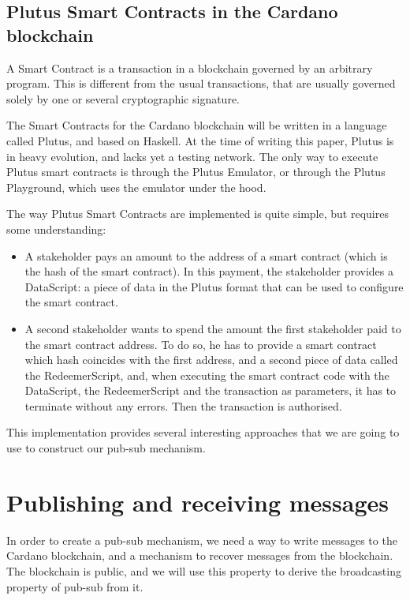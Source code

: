 \documentclass{article}
\begin{document}
\subsection{Plutus Smart Contracts in the Cardano blockchain}
A Smart Contract is a transaction in a blockchain governed by an arbitrary program. This is different from the usual transactions, that are usually governed solely by one or several cryptographic signature.

The Smart Contracts for the Cardano blockchain will be written in a language called Plutus, and based on Haskell. At the time of writing this paper, Plutus is in heavy evolution, and lacks yet a testing network. The only way to execute Plutus smart contracts is through the Plutus Emulator\cite{plutus-emulator}, or through the Plutus Playground\cite{plutus-playground}, which uses the emulator under the hood.

The way Plutus Smart Contracts are implemented is quite simple, but requires some understanding:

\begin{itemize}
\item A stakeholder pays an amount to the address of a smart contract (which is the hash of the smart contract). In this payment, the stakeholder provides a DataScript: a piece of data in the Plutus format that can be used to configure the smart contract.
\item A second stakeholder wants to spend the amount the first stakeholder paid to the smart contract address. To do so, he has to provide a smart contract which hash coincides with the first address, and a second piece of data called the RedeemerScript, and, when executing the smart contract code with the DataScript, the RedeemerScript and the transaction as parameters, it has to terminate without any errors. Then the transaction is authorised.
\end{itemize}

This implementation provides several interesting approaches that we are going to use to construct our pub-sub mechanism.

\section{Publishing and receiving messages}

In order to create a pub-sub mechanism, we need a way to write messages to the Cardano blockchain, and a mechanism to recover messages from the blockchain. The blockchain is public, and we will use this property to derive the broadcasting property of pub-sub from it.
\end{document}
